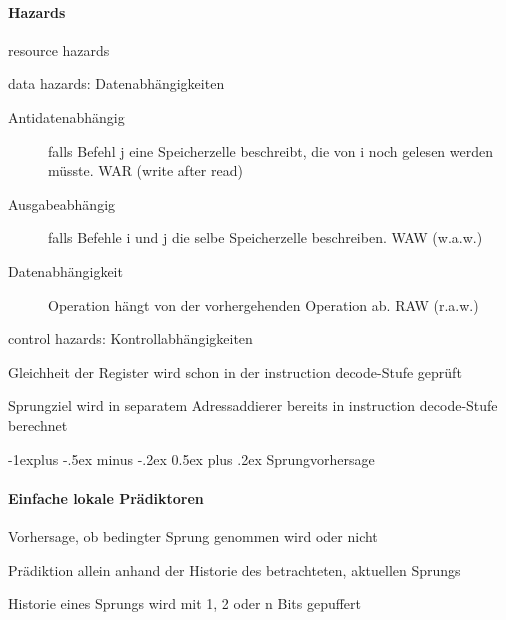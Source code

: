 \documentclass[10pt,landscape]{article}
\makeatletter
\renewcommand{\subsection}{\@startsection{subsection}{2}{0mm}%
                                {-1explus -.5ex minus -.2ex}%
                                {0.5ex plus .2ex}%
                                {\normalfont\normalsize\bfseries}}
\makeatother
\begin{document}
\begin{multicols}{3}
  \paragraph*{Hazards}
  \begin{itemize*}
    \item resource hazards
    \item data hazards: Datenabhängigkeiten
    \begin{description}
      \item[Antidatenabhängig] falls Befehl j eine Speicherzelle beschreibt, die von i noch gelesen werden müsste. WAR (write after read)
      \item[Ausgabeabhängig] falls Befehle i und j die selbe Speicherzelle beschreiben. WAW (w.a.w.)
      \item[Datenabhängigkeit] Operation hängt von der vorhergehenden Operation ab. RAW (r.a.w.)
    \end{description}
    \item control hazards: Kontrollabhängigkeiten
    \begin{itemize*}
      \item Gleichheit der Register wird schon in der instruction decode-Stufe geprüft
      \item Sprungziel wird in separatem Adressaddierer bereits in instruction decode-Stufe berechnet
    \end{itemize*}
  \end{itemize*}
  
  \subsection{ Sprungvorhersage}
  \paragraph{Einfache lokale Prädiktoren}
  \begin{itemize*}
    \item Vorhersage, ob bedingter Sprung genommen wird oder nicht
    \item Prädiktion allein anhand der Historie des betrachteten, aktuellen Sprungs
    \item Historie eines Sprungs wird mit 1, 2 oder n Bits gepuffert
  \end{itemize*}
  

\end{multicols}
\end{document}
